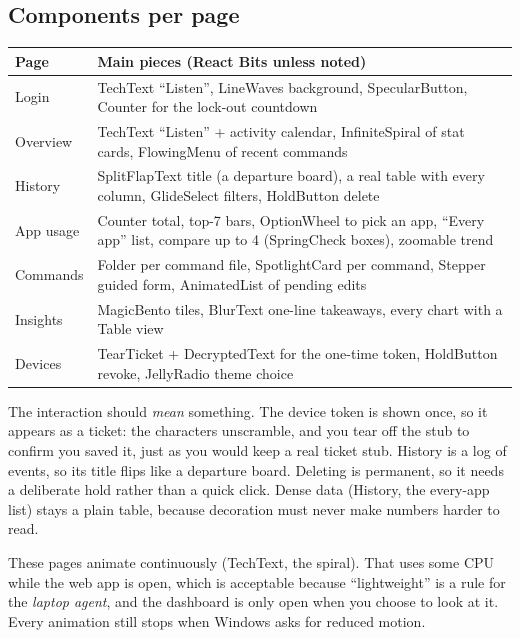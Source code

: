 \documentclass[11pt,a4paper]{article}
\begin{document}
\subsection{Components per page}
\begin{center}
\renewcommand{\arraystretch}{1.15}
\begin{tabularx}{\textwidth}{l X}
\toprule
\textbf{Page} & \textbf{Main pieces (React Bits unless noted)} \\
\midrule
Login     & TechText ``Listen'', LineWaves background, SpecularButton, Counter for the lock-out countdown \\
Overview  & TechText ``Listen'' + activity calendar, InfiniteSpiral of stat cards, FlowingMenu of recent commands \\
History   & SplitFlapText title (a departure board), a real table with every column, GlideSelect filters, HoldButton delete \\
App usage & Counter total, top-7 bars, OptionWheel to pick an app, ``Every app'' list, compare up to 4 (SpringCheck boxes), zoomable trend \\
Commands  & Folder per command file, SpotlightCard per command, Stepper guided form, AnimatedList of pending edits \\
Insights  & MagicBento tiles, BlurText one-line takeaways, every chart with a Table view \\
Devices   & TearTicket + DecryptedText for the one-time token, HoldButton revoke, JellyRadio theme choice \\
\bottomrule
\end{tabularx}
\end{center}

\begin{why}
The interaction should \emph{mean} something. The device token is shown once, so it appears as a
ticket: the characters unscramble, and you tear off the stub to confirm you saved it, just as you
would keep a real ticket stub. History is a log of events, so its title flips like a departure
board. Deleting is permanent, so it needs a deliberate hold rather than a quick click. Dense data
(History, the every-app list) stays a plain table, because decoration must never make numbers
harder to read.
\end{why}

\begin{caution}
These pages animate continuously (TechText, the spiral). That uses some CPU while the web app is
open, which is acceptable because ``lightweight'' is a rule for the \emph{laptop agent}, and the
dashboard is only open when you choose to look at it. Every animation still stops when Windows
asks for reduced motion.
\end{caution}
\end{document}
